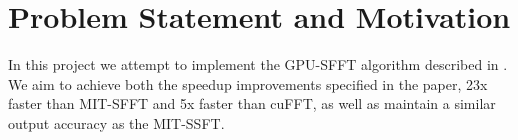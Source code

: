 
\section{Problem Statement and Motivation}
In this project we attempt to implement the GPU-SFFT algorithm described in \cite{GPU-SFFT}. 
We aim to achieve both the speedup improvements specified in the paper, 23x faster than MIT-SFFT and 5x faster than cuFFT,
as well as maintain a similar output accuracy as the MIT-SSFT.